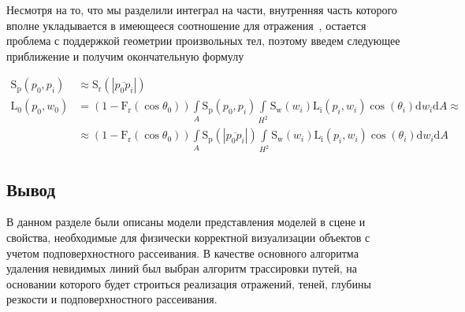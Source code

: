 Несмотря на то, что мы разделили интеграл на части, внутренняя часть которого
вполне укладывается в имеющееся соотношение для
отражения~, остается проблема с поддержкой геометрии
произвольных тел, поэтому введем следующее приближение и получим окончательную
формулу

\begin{align}
    \mathrm{S_p}(p_0, p_i) & \approx \mathrm{S_r}(|\overline{p_0 p_i}|) \\
    \mathrm{L_0}(p_0, w_0) & = (1 - \mathrm{F_r}(\cos\theta_0))
                               \int\limits_{A^{}} \mathrm{S_p}(p_0, p_i)
                               \int\limits_{{H^2}^{}} \mathrm{S_w}(w_i)
                               \mathrm{L_i}(p_i, w_i) \cos(\theta_i)
                               \mathrm{d} w_i \mathrm{d} A \approx \nonumber \\
                           & \approx (1 - \mathrm{F_r}(\cos\theta_0))
                             \int\limits_{A^{}}
                             \mathrm{S_p}(|\overline{p_0 p_i}|)
                             \int\limits_{{H^2}^{}} \mathrm{S_w}(w_i)
                             \mathrm{L_i}(p_i, w_i) \cos(\theta_i)
                             \mathrm{d} w_i \mathrm{d} A
\end{align}

\subsection*{Вывод}
В данном разделе были описаны модели представления моделей в сцене и
свойства, необходимые для физически корректной визуализации объектов с учетом
подповерхностного рассеивания. В качестве основного алгоритма удаления
невидимых линий был выбран алгоритм трассировки путей, на основании которого
будет строиться реализация отражений, теней, глубины резкости и
подповерхностного рассеивания.

\pagebreak

